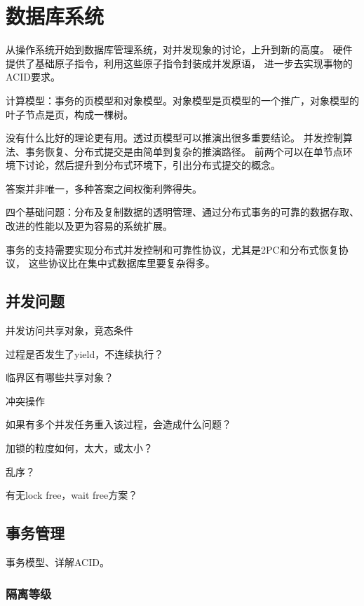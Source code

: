 \chapter{数据库系统}

从操作系统开始到数据库管理系统，对并发现象的讨论，上升到新的高度。
硬件提供了基础原子指令，利用这些原子指令封装成并发原语，
进一步去实现事物的ACID要求。

计算模型：事务的页模型和对象模型。对象模型是页模型的一个推广，对象模型的叶子节点是页，构成一棵树。

没有什么比好的理论更有用。透过页模型可以推演出很多重要结论。
并发控制算法、事务恢复、分布式提交是由简单到复杂的推演路径。
前两个可以在单节点环境下讨论，然后提升到分布式环境下，引出分布式提交的概念。

答案并非唯一，多种答案之间权衡利弊得失。

四个基础问题：分布及复制数据的透明管理、通过分布式事务的可靠的数据存取、
改进的性能以及更为容易的系统扩展。

事务的支持需要实现分布式并发控制和可靠性协议，尤其是2PC和分布式恢复协议，
这些协议比在集中式数据库里要复杂得多。

\section{并发问题}

并发访问共享对象，竞态条件

\begin{enumbox}
\item 过程是否发生了yield，不连续执行？
\item 临界区有哪些共享对象？
\item 冲突操作
\item 如果有多个并发任务重入该过程，会造成什么问题？
\item 加锁的粒度如何，太大，或太小？
\item 乱序？
\item 有无lock free，wait free方案？
\end{enumbox}

\section{事务管理}

事务模型、详解ACID。

\subsection{隔离等级}

